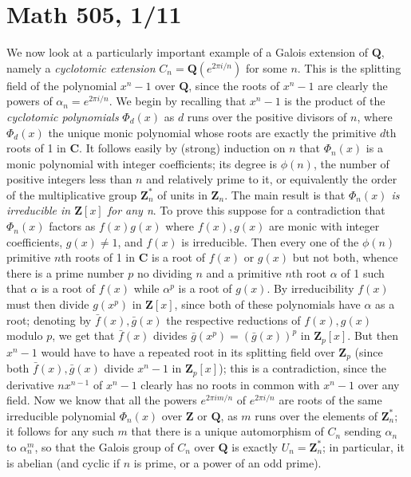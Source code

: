 \documentclass[10pt]{article}
\begin{document}
\section*{Math 505, 1/11}

We now look at a particularly important example of a Galois extension of
$\mathbf Q$, namely a {\sl cyclotomic extension} $C_n = \mathbf
Q(e^{2\pi i/n})$ for some $n$. This is the splitting field of the
polynomial $x^n - 1$ over $\mathbf Q$, since the roots of $x^n - 1$ are
clearly the powers of $\alpha_n = e^{2\pi i/n}$. We begin by recalling
that $x^n - 1$ is the product of the {\sl cyclotomic polynomials}
$\Phi_d(x)$ as $d$ runs over the positive divisors of $n$, where
$\Phi_d(x)$ the unique monic polynomial whose roots are exactly the
primitive $d$th roots of 1 in $\mathbf C$. It follows easily by (strong)
induction on $n$ that $\Phi_n(x)$ is a monic polynomial with integer
coefficients; its degree is $\phi(n)$, the number of positive integers
less than $n$ and relatively prime to it, or equivalently the order of
the multiplicative group $\mathbf Z_n^*$ of units in $\mathbf Z_n$. The
main result is that {\sl $\Phi_n(x)$ is irreducible in $\mathbf Z[x]$
  for any n}. To prove this suppose for a contradiction that $\Phi_n(x)$
factors as $f(x) g(x)$ where $f(x),g(x)$ are monic with integer
coefficients, $g(x)\ne1$, and $f(x)$ is irreducible. Then every one of
the $\phi(n)$ primitive $n$th roots of 1 in $\mathbf C$ is a root of
$f(x)$ or $g(x)$ but not both, whence there is a prime number $p$ no
dividing $n$ and a primitive $n$th root $\alpha$ of 1 such that $\alpha$
is a root of $f(x)$ while $\alpha^p$ is a root of $g(x)$. By
irreducibility $f(x)$ must then divide $g(x^p)$ in $\mathbf Z[x]$, since
both of these polynomials have $\alpha$ as a root; denoting by $\bar
f(x),\bar g(x)$ the respective reductions of $f(x),g(x)$ modulo $p$, we
get that $\bar f(x)$ divides $\bar g(x^p) = (\bar g(x))^p$ in $\mathbf
Z_p[x]$. But then $x^n - 1$ would have to have a repeated root in its
splitting field over $\mathbf Z_p$ (since both $\bar f(x),\bar g(x)$
divide $x^n - 1$ in $\mathbf Z_p[x]$); this is a contradiction, since
the derivative $nx^{n-1}$ of $x^n - 1$ clearly has no roots in common
with $x^n - 1$ over any field. Now we know that all the powers $e^{2\pi
  i m/n}$ of $e^{2\pi i/n}$ are roots of the same irreducible polynomial
$\Phi_n(x)$ over $\mathbf Z$ or $\mathbf Q$, as $m$ runs over the
elements of $\mathbf Z_n^*$; it follows for any such $m$ that there is a
unique automorphism of $C_n$ sending $\alpha_n$ to $\alpha_n^m$, so that
the Galois group of $C_n$ over $\mathbf Q$ is exactly $U_n = \mathbf
Z_n^*$; in particular, it is abelian (and cyclic if $n$ is prime, or a
power of an odd prime).
\end{document}
